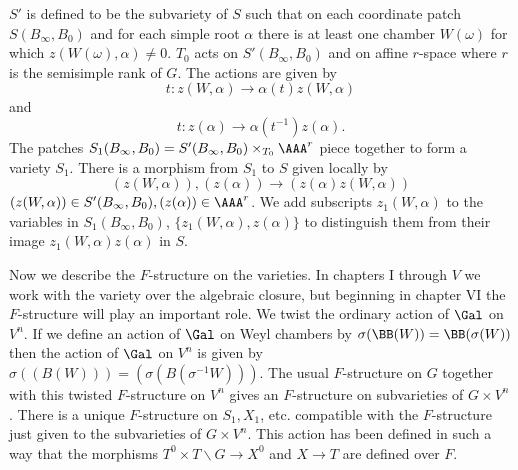 \documentclass{memo-l}
\theoremstyle{definition}
\theoremstyle{remark}
\numberwithin{section}{chapter}
\numberwithin{equation}{chapter}
\begin{document}
$S'$ is defined to be the subvariety of $S$ such that on each
coordinate patch $S(B_{{\infty}},B_{0})$ and for each simple root
${\alpha}$ there is at least one chamber $W({\omega})$ for which
$z(W({\omega}),{\alpha})\ne 0$.  $T_{0}$ acts on
$S'(B_{{\infty}},B_{0})$ and on affine $r$-space where $r$ is the
semisimple rank of $G$.  The actions are given by
$$
t: z(W,{\alpha}) {\to} {\alpha}(t)z(W,{\alpha})
$$
and
$$
t: z({\alpha}) {\to} {\alpha}(t^{-1})z({\alpha}).
$$
The patches $S_{1}(B_{{\infty}},B_{0}) = S'(B_{{\infty}},B_{0}) \times_{T_0}
{\AAA}^{r}$ piece together to form a variety $S_{1}$.
 There is a morphism from $S_{1}$ to $S$ given locally by
$$
(z(W,{\alpha})),(z({\alpha})) {\to} (z({\alpha})z(W,{\alpha}))
$$
$(z(W,{\alpha})) \in S'(B_{{\infty}},B_{0}), (z({\alpha})) \in
{\AAA}^{{r}}$.  We add subscripts $z_1(W,\alpha)$ to the variables in 
$S_1(B_\infty,B_0)$, $\{z_1(W,\alpha),z(\alpha)\}$ to distinguish them
from their image $z_1(W,\alpha)z(\alpha)$ in $S$.

   Now we describe the $F$-structure on the varieties.
 In chapters I through $V$ we work with the variety over the algebraic closure,
but beginning in chapter VI the $F$-structure will play an important role.
 We twist the ordinary action of $\Gal$ on $V^{n}$.   %
 If we define an action of $\Gal$ on Weyl chambers by
$\sigma({\BB}(W)) = {\BB}({\sigma}(W))$ then the action of
$\Gal$ on $V^{n}$ is given by ${\sigma}((B(W))) =
(\sigma(B({\sigma}^{-1}W)))$.
 The usual $F$-structure on $G$ together with this twisted $F$-structure on
$V^{n}$ gives an $F$-structure on subvarieties of $G \times V^{n}$.
 There is a unique $F$-structure on $S_{1}, X_{1}$, etc.
compatible with the $F$-structure just given to the
subvarieties of $G \times V^{n}$.
 This action has been defined in such a way that the morphisms 
$T^{0} \times T\backslash G {\to} X^{0}$ and $X {\to} T$ are defined over $F$.
\end{document}
